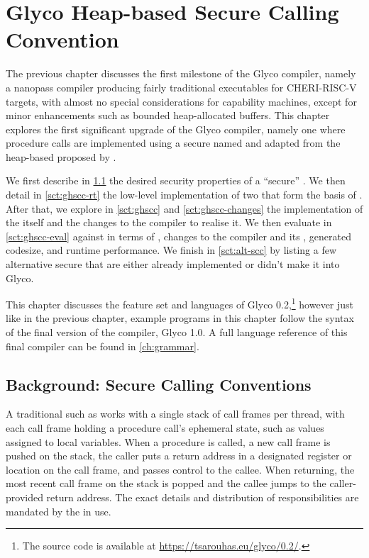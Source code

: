 \documentclass[main.tex]{subfiles}
\begin{document}
\onlyinsubfile{\mainmatter{}}

\chapter{Glyco Heap-based Secure Calling Convention} \label{ch:ghscc}
The previous chapter discusses the first milestone of the Glyco compiler, namely a nanopass compiler producing fairly traditional executables for CHERI-RISC-V targets, with almost no special considerations for capability machines, except for minor enhancements such as bounded heap-allocated buffers. This chapter explores the first significant upgrade of the Glyco compiler, namely one where procedure calls are implemented using a secure  named \textbf{} and adapted from the heap-based  proposed by \cite{cerise}.

We first describe in \cref{sct:scc} the desired security properties of a \enquote{secure} . We then detail in \cref{sct:ghscc-rt} the low-level implementation of two  that form the basis of . After that, we explore in \cref{sct:ghscc} and \cref{sct:ghscc-changes} the implementation of the  itself and the changes to the compiler to realise it. We then evaluate in \cref{sct:ghscc-eval}  against  in terms of , changes to the compiler and its , generated codesize, and runtime performance. We finish in \cref{sct:alt-scc} by listing a few alternative secure  that are either already implemented or didn't make it into Glyco.

This chapter discusses the feature set and languages of Glyco 0.2,\footnote{The source code is available at \url{https://tsarouhas.eu/glyco/0.2/}.} however just like in the previous chapter, example programs in this chapter follow the syntax of the final version of the compiler, Glyco 1.0. A full language reference of this final compiler can be found in \cref{ch:grammar}.

\section{Background: Secure Calling Conventions} \label{sct:scc}
A traditional  such as  works with a single stack of call frames per thread, with each call frame holding a procedure call's ephemeral state, such as values assigned to local variables. When a procedure is called, a new call frame is pushed on the stack, the caller puts a return address in a designated register or location on the call frame, and passes control to the callee. When returning, the most recent call frame on the stack is popped and the callee jumps to the caller-provided return address. The exact details and distribution of responsibilities are mandated by the  in use.
\end{document}
